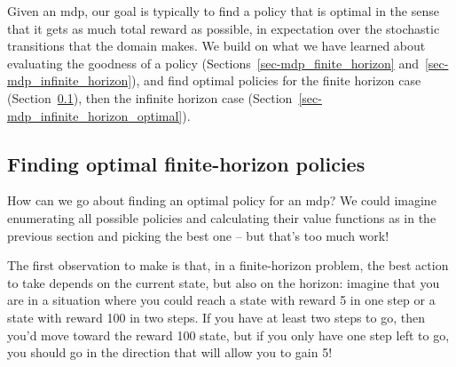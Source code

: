 Given an {\sc mdp}, our goal is typically to find a policy that is
optimal in the sense that it gets as much total reward as possible, in
expectation over the stochastic transitions that the domain makes.  We
build on what we have learned about evaluating the goodness of a
policy (Sections~\ref{sec-mdp_finite_horizon}
and~\ref{sec-mdp_infinite_horizon}), and find optimal policies for the
finite horizon case (Section~\ref{sec-mdp_finite_horizon_optimal}),
then the infinite horizon case
(Section~\ref{sec-mdp_infinite_horizon_optimal}).

\subsection{Finding optimal finite-horizon policies}

\label{sec-mdp_finite_horizon_optimal}

How can we go about finding an optimal policy for an {\sc mdp}?
 We could imagine enumerating all
possible policies and calculating their value functions as in the previous section and
picking the best one -- but that's too much work!

The first observation to make is that, in a finite-horizon problem,
the best action to take depends on the current state, but also on the
horizon: imagine that you are in a situation where you could reach a
state with reward 5 in one step or a state with reward 100 in two
steps.  If you have at least two steps to go, then you'd move toward
the reward 100 state, but if you only have one step left to go, you should
go in the direction that will allow you to gain 5!

